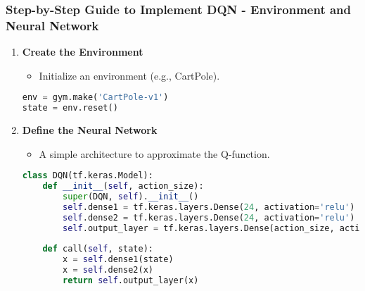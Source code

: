 \documentclass[aspectratio=169]{beamer}
\begin{document}
\begin{frame}[fragile]
    \frametitle{Step-by-Step Guide to Implement DQN - Environment and Neural Network}
    \begin{enumerate}
        \item \textbf{Create the Environment}
        \begin{itemize}
            \item Initialize an environment (e.g., CartPole).
        \end{itemize}
        
        \begin{lstlisting}[language=Python]
env = gym.make('CartPole-v1')
state = env.reset()
        \end{lstlisting}

        \item \textbf{Define the Neural Network}
        \begin{itemize}
            \item A simple architecture to approximate the Q-function.
        \end{itemize}
        
        \begin{lstlisting}[language=Python]
class DQN(tf.keras.Model):
    def __init__(self, action_size):
        super(DQN, self).__init__()
        self.dense1 = tf.keras.layers.Dense(24, activation='relu')
        self.dense2 = tf.keras.layers.Dense(24, activation='relu')
        self.output_layer = tf.keras.layers.Dense(action_size, activation='linear')
        
    def call(self, state):
        x = self.dense1(state)
        x = self.dense2(x)
        return self.output_layer(x)
        \end{lstlisting}

    \end{enumerate}
\end{frame}
\end{document}
